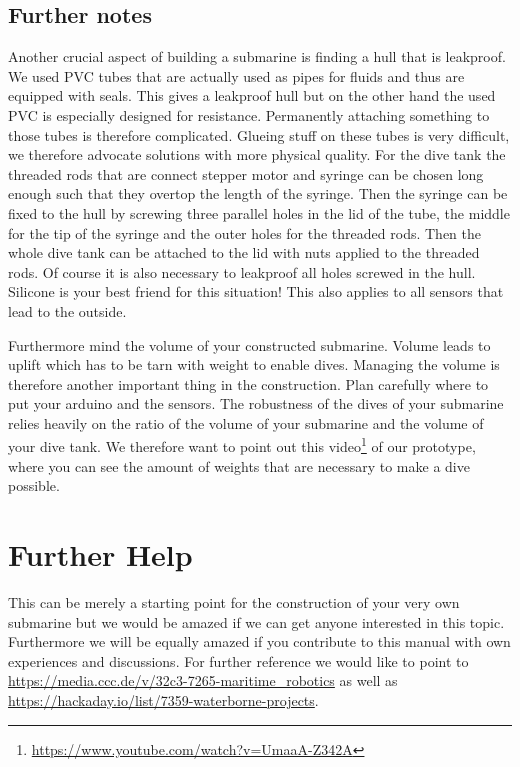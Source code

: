 \documentclass{tufte-handout}
\begin{document}
\subsection{Further notes}
Another crucial aspect of building a submarine is finding a hull that is
leakproof. We used PVC tubes that are actually used as pipes for fluids and
thus are equipped with seals. This gives a leakproof hull but on the other hand
the used PVC is especially designed for resistance. Permanently attaching
something to those tubes is therefore complicated. Glueing stuff on these tubes
is very difficult, we therefore advocate solutions with more physical quality.
For the dive tank the threaded rods that are connect stepper motor and syringe
can be chosen long enough such that they overtop the length of the syringe.
Then the syringe can be fixed to the hull by screwing three parallel holes in
the lid of the tube, the middle for the tip of the syringe and the outer holes
for the threaded rods. Then the whole dive tank can be attached to the lid with
nuts applied to the threaded rods. Of course it is also necessary to leakproof
all holes screwed in the hull. Silicone is your best friend for this situation!
This also applies to all sensors that lead to the outside.

Furthermore mind the volume of your constructed submarine. Volume leads to
uplift which has to be tarn with weight to enable dives. Managing the volume is
therefore another important thing in the construction. Plan carefully where to
put your arduino and the sensors. The robustness of the dives of your submarine
relies heavily on the ratio of the volume of your submarine and the volume of
your dive tank. We therefore want to point out this
video\footnote{\url{https://www.youtube.com/watch?v=UmaaA-Z342A}} of our
prototype, where you can see the amount of weights that are necessary to make a
dive possible.

\section{Further Help}
This can be merely a starting point for the construction of your very own
submarine but we would be amazed if we can get anyone interested in this topic.
Furthermore we will be equally amazed if you contribute to this manual with own
experiences and discussions.
For further reference we would like to point to
\url{https://media.ccc.de/v/32c3-7265-maritime_robotics} as well as
\url{https://hackaday.io/list/7359-waterborne-projects}.
\end{document}
